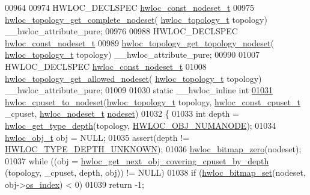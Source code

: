 \begin{DoxyCode}
00964 
00974 HWLOC\_DECLSPEC \hyperlink{a00183_ga2f5276235841ad66a79bedad16a5a10c}{hwloc\_const\_nodeset\_t}
00975 \hyperlink{a00202_ga773fd98949461ef4c1e3170bb0c0418f}{hwloc\_topology\_get\_complete\_nodeset}(
      \hyperlink{a00186_ga9d1e76ee15a7dee158b786c30b6a6e38}{hwloc\_topology\_t} topology) \_\_hwloc\_attribute\_pure;
00976 
00988 HWLOC\_DECLSPEC \hyperlink{a00183_ga2f5276235841ad66a79bedad16a5a10c}{hwloc\_const\_nodeset\_t}
00989 \hyperlink{a00202_ga3fd37303e99ace8b0d0ea03f95f8c514}{hwloc\_topology\_get\_topology\_nodeset}(
      \hyperlink{a00186_ga9d1e76ee15a7dee158b786c30b6a6e38}{hwloc\_topology\_t} topology) \_\_hwloc\_attribute\_pure;
00990 
01007 HWLOC\_DECLSPEC \hyperlink{a00183_ga2f5276235841ad66a79bedad16a5a10c}{hwloc\_const\_nodeset\_t}
01008 \hyperlink{a00202_ga21a4d7237a11e76b912ed4524ab78cbd}{hwloc\_topology\_get\_allowed\_nodeset}(
      \hyperlink{a00186_ga9d1e76ee15a7dee158b786c30b6a6e38}{hwloc\_topology\_t} topology) \_\_hwloc\_attribute\_pure;
01009 
01030 \textcolor{keyword}{static} \_\_hwloc\_inline \textcolor{keywordtype}{int}
\hyperlink{a00203_ga185751c1653fedbeb7cc480840f38cde}{01031} \hyperlink{a00203_ga185751c1653fedbeb7cc480840f38cde}{hwloc\_cpuset\_to\_nodeset}(\hyperlink{a00186_ga9d1e76ee15a7dee158b786c30b6a6e38}{hwloc\_topology\_t} topology, 
      \hyperlink{a00183_ga1f784433e9b606261f62d1134f6a3b25}{hwloc\_const\_cpuset\_t} \_cpuset, \hyperlink{a00183_ga37e35730fa7e775b5bb0afe893d6d508}{hwloc\_nodeset\_t} 
      \hyperlink{a00238_a08f0d0e16c619a6e653526cbee4ffea3}{nodeset})
01032 \{
01033         \textcolor{keywordtype}{int} depth = \hyperlink{a00187_ga8bec782e21be313750da70cf7428b374}{hwloc\_get\_type\_depth}(topology, 
      \hyperlink{a00184_ggacd37bb612667dc437d66bfb175a8dc55a9d917a3e5497950c6d8948b8e183db5a}{HWLOC\_OBJ\_NUMANODE});
01034         \hyperlink{a00238}{hwloc\_obj\_t} obj = NULL;
01035         assert(depth != \hyperlink{a00187_ggaf4e663cf42bbe20756b849c6293ef575a0565ab92ab72cb0cec91e23003294aad}{HWLOC\_TYPE\_DEPTH\_UNKNOWN});
01036         \hyperlink{a00205_gaa97c5217613c8cae9862287170ea2132}{hwloc\_bitmap\_zero}(nodeset);
01037         \textcolor{keywordflow}{while} ((obj = \hyperlink{a00196_gaba4b6d86eba1169ced4b0e941d2bb5f0}{hwloc\_get\_next\_obj\_covering\_cpuset\_by\_depth}
      (topology, \_cpuset, depth, obj)) != NULL)
01038                 \textcolor{keywordflow}{if} (\hyperlink{a00205_ga062dbff93baeff3b425a7260c5463646}{hwloc\_bitmap\_set}(nodeset, obj->\hyperlink{a00238_a61a7a80a68eaccbaaa28269e678c81a9}{os\_index}) < 0)
01039                         \textcolor{keywordflow}{return} -1;

\end{DoxyCode}
